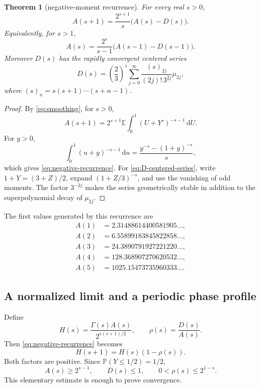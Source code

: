 \documentclass[11pt,oneside]{article}
\newtheorem{theorem}{Theorem}[section]
\theoremstyle{definition}
\newcommand{\E}{\mathbb E}
\newcommand{\Prob}{\mathbb P}
\newcommand{\dd}{\,\mathrm d}
\begin{document}
\begin{theorem}[negative-moment recurrence]\label{thm:negative-recurrence}
For every real \(s>0\),
\begin{equation}\label{eq:negative-recurrence}
 A(s+1)=\frac{2^{s+1}}s\bigl(A(s)-D(s)\bigr).
\end{equation}
Equivalently, for \(s>1\),
\begin{equation}\label{eq:negative-recurrence-shifted}
 A(s)=\frac{2^s}{s-1}\bigl(A(s-1)-D(s-1)\bigr).
\end{equation}
Moreover \(D(s)\) has the rapidly convergent centered series
\begin{equation}\label{eq:D-centered-series}
 D(s)=\left(\frac23\right)^s
 \sum_{j=0}^{\infty}
 \frac{(s)_{2j}}{(2j)!\,3^{2j}}\mu_{2j},
\end{equation}
where \((s)_n=s(s+1)\cdots(s+n-1)\).
\end{theorem}

\begin{proof}
By \cref{eq:smoothing}, for \(s>0\),
\[
 A(s+1)=2^{s+1}\E\int_0^1(U+Y')^{-s-1}\dd U.
\]
For \(y>0\),
\[
 \int_0^1(u+y)^{-s-1}\dd u
 =\frac{y^{-s}-(1+y)^{-s}}s,
\]
which gives \cref{eq:negative-recurrence}.  For \cref{eq:D-centered-series}, write
\(1+Y=(3+Z)/2\), expand \((1+Z/3)^{-s}\), and use the vanishing of odd moments.
The factor \(3^{-2j}\) makes the series geometrically stable in addition to the
superpolynomial decay of \(\mu_{2j}\).
\end{proof}

The first values generated by this recurrence are
\begin{align}
 A(1)&=2.31488614400581905\ldots,\nonumber\\
 A(2)&=6.55899183845822858\ldots,\nonumber\\
 A(3)&=24.3890791927221220\ldots,\nonumber\\
 A(4)&=128.368907270620532\ldots,\nonumber\\
 A(5)&=1025.15473735960333\ldots.\label{eq:negative-values}
\end{align}

\subsection{A normalized limit and a periodic phase profile}

Define
\begin{equation}\label{eq:H-def}
 H(s)=\frac{\Gamma(s)A(s)}{2^{s(s+1)/2}},
 \qquad
 \rho(s)=\frac{D(s)}{A(s)}.
\end{equation}
Then \cref{eq:negative-recurrence} becomes
\begin{equation}\label{eq:H-recurrence}
 H(s+1)=H(s)(1-\rho(s)).
\end{equation}
Both factors are positive.  Since \(\Prob(Y\le1/2)=1/2\),
\begin{equation}\label{eq:rho-bound}
 A(s)\ge2^{s-1},\qquad D(s)\le1,
 \qquad 0<\rho(s)\le2^{1-s}.
\end{equation}
This elementary estimate is enough to prove convergence.
\end{document}

